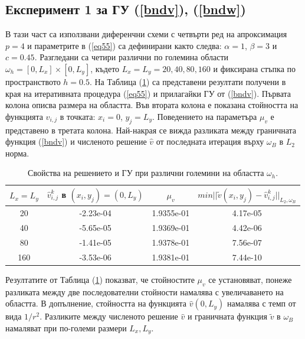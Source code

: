 \documentclass{article}
\newcommand{\rf}[1]{(\ref{#1})}
\begin{document}
\subsection{Експеримент 1 за ГУ \rf{bndv}, \rf{bndw}}
В тази част са използвани диференчни схеми с четвърти ред на апроксимация $p=4$ и параметрите в \rf{eq55} са дефинирани както следва: $\alpha = 1$, $\beta = 3$ и $c=0.45$. Разгледани са четири различни по големина области $\omega_h = [0, L_x] \times [0, L_y]$, където $L_x = L_y = 20, 40, 80, 160$ и фиксирана стъпка по пространството $h=0.5$. На Таблица \rf{tab:valBnd1} са представени резултати получени в края на итеративната процедура \rf{eq55} и прилагайки ГУ от \rf{bndv}. Първата колона описва размера на областта. Във втората колона е показана стойността на функцията $\widehat{v}_{i,j}$ в точката: ${x}_i = 0$, $ {y}_j =   L_{ y}$. Поведението на параметъра $\mu_v$ е представено в третата колона. Най-накрая се вижда разликата между граничната функция \rf{bndv} и численото решение $\widehat{v}$ от последната итерация върху $\omega_B$ в $L_2$ норма.
\begin{table}[ht]
\centering
		\begin{tabular}{||c||c|c|c||}
			\hline
			\hline
      $ L_{ x} = L_{ y}$        &         $\widehat{v}_{i,j}^k$ в  $({x}_i, {y}_j) = (0, L_{ y})$    &    $\mu_v$  &   \mbox{$min|| \tilde v( x_i, y_j) - \widehat v ^k_{i,j} ||_{L_2,\omega_B}$}\\
   			\hline
			\hline
      20    & -2.23e-04    &  1.9355e-01  &     4.17e-05  \\
               	 \hline
    40      & -5.65e-05   &   1.9369e-01    &    4.42e-06 \\
			\hline 	
      80    & -1.41e-05  &      1.9378e-01      &       7.56e-07  \\
			\hline 	
     160     & -3.53e-06  &    1.9381e-01        &     7.44e-10 \\
		   \hline
	             \hline
                     \end{tabular}
\caption{Свойства на решението и ГУ при различни големини на областта $\omega_h$.}
\label{tab:valBnd1}
\end{table}
\FloatBarrier
Резултатите от Таблица \rf{tab:valBnd1} показват, че стойностите $\mu_v$ се установяват, понеже разликата между две последователни стойности намалява с увеличаването на областта. В допълнение, стойността на функцията $\widehat v(0,L_y)$ намалява с темп от вида $1/r^2$. Разликите между численото решение $\widehat v$ и граничната функция $\tilde v$ в $\omega_B$ намаляват при по-големи размери $L_x, L_y$. 
\end{document}

